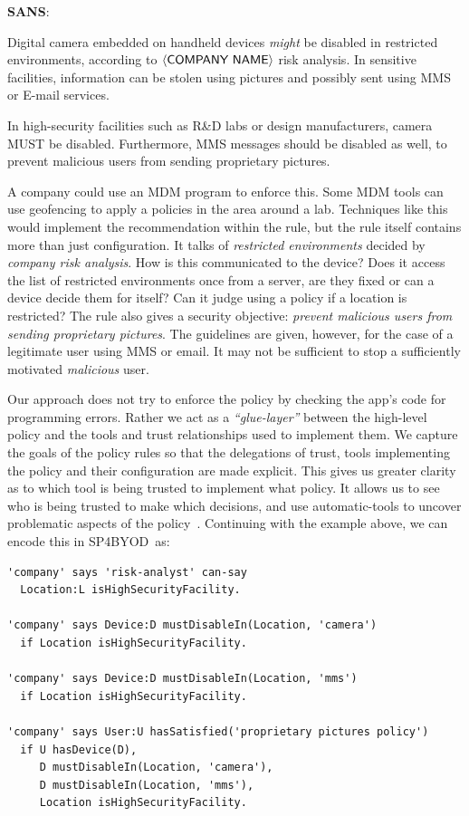 \documentclass{llncs}
\newcommand{\AppPAL}[0]{SP4BYOD}
\newenvironment{policyrule}[1]{%
  \begin{mdframed}[]\footnotesize
      \noindent\textbf{\sffamily #1}:~\itshape%
}{%
  \end{mdframed}
}
\begin{document}
\newcommand{\textbra}[1]{\ensuremath{\left\langle \text{\sffamily #1} \right\rangle}}
\begin{policyrule}{SANS}
  Digital camera embedded on handheld devices \emph{might} be disabled in restricted environments, according to \textbra{COMPANY NAME} risk analysis.
  In sensitive facilities, information can be stolen using pictures and possibly sent using MMS or E-mail services.

  In high-security facilities such as R\&D labs or design manufacturers, camera MUST be disabled.
  Furthermore, MMS messages should be disabled as well, to prevent malicious users from sending proprietary pictures.
\end{policyrule}

A company could use an \ac{MDM} program to enforce this.
Some \ac{MDM} tools can use geofencing to apply a policies in the area around a lab.
Techniques like this would implement the recommendation within the rule, but the rule itself contains more than just configuration.
It talks of \emph{restricted environments} decided by \emph{company risk analysis}.
How is this communicated to the device?
Does it access the list of restricted environments once from a server, are they fixed or can a device decide them for itself?
Can it judge using a policy if a location is restricted?
The rule also gives a security objective: \emph{prevent malicious users from sending proprietary pictures}.
The guidelines are given, however, for the case of a legitimate user using MMS or email.
It may not be sufficient to stop a sufficiently motivated \emph{malicious} user.

Our approach does not try to enforce the policy by checking the app's code for programming errors.
Rather we act as a \emph{``glue-layer''} between the high-level policy and the tools and trust relationships used to implement them.
We capture the goals of the policy rules so that the delegations of trust, tools implementing the policy and their configuration are made explicit.
This gives us greater clarity as to which tool is being trusted to implement what policy.
It allows us to see who is being trusted to make which decisions,
  and use automatic-tools to uncover problematic aspects of the policy~\cite{hallett_specifying_2016}.
Continuing with the example above, we can encode this in \AppPAL~as:

\begin{lstlisting}
'company' says 'risk-analyst' can-say
  Location:L isHighSecurityFacility.

'company' says Device:D mustDisableIn(Location, 'camera')
  if Location isHighSecurityFacility.

'company' says Device:D mustDisableIn(Location, 'mms')
  if Location isHighSecurityFacility.

'company' says User:U hasSatisfied('proprietary pictures policy')
  if U hasDevice(D),
     D mustDisableIn(Location, 'camera'),
     D mustDisableIn(Location, 'mms'),
     Location isHighSecurityFacility.
\end{lstlisting}
\end{document}
